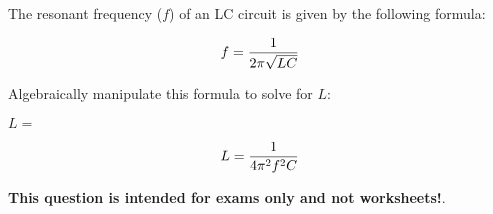 

The resonant frequency ($f$) of an LC circuit is given by the following formula:

$$f = {1 \over {2 \pi \sqrt{LC}}}$$

Algebraically manipulate this formula to solve for $L$:

\vskip 20pt

$L = $







$$L = {1 \over {4 \pi^2 f^2 C}}$$







{\bf This question is intended for exams only and not worksheets!}.



